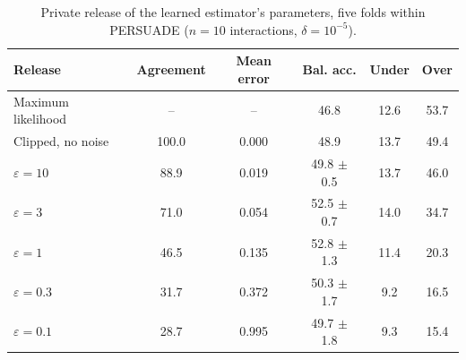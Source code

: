 \begin{table}[H]
\caption{Private release of the learned estimator's parameters, five folds within PERSUADE ($n = 10$ interactions, $\delta = 10^{-5}$).\label{tab:real-privacy}}
\small
\begin{tabularx}{\textwidth}{Lccccc}
\toprule
\textbf{Release} & \textbf{Agreement} & \textbf{Mean error} & \textbf{Bal. acc.} & \textbf{Under} & \textbf{Over} \\
\midrule
Maximum likelihood & -- & -- & 46.8 & 12.6 & 53.7 \\
Clipped, no noise & 100.0 & 0.000 & 48.9 & 13.7 & 49.4 \\
$\varepsilon = 10$ & 88.9 & 0.019 & 49.8 $\pm$ 0.5 & 13.7 & 46.0 \\
$\varepsilon = 3$ & 71.0 & 0.054 & 52.5 $\pm$ 0.7 & 14.0 & 34.7 \\
$\varepsilon = 1$ & 46.5 & 0.135 & 52.8 $\pm$ 1.3 & 11.4 & 20.3 \\
$\varepsilon = 0.3$ & 31.7 & 0.372 & 50.3 $\pm$ 1.7 & 9.2 & 16.5 \\
$\varepsilon = 0.1$ & 28.7 & 0.995 & 49.7 $\pm$ 1.8 & 9.3 & 15.4 \\
\bottomrule
\end{tabularx}
\end{table}
